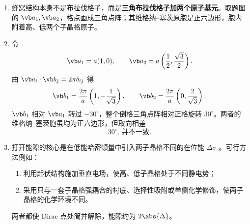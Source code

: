 \begin{question}[10 分]
\begin{solution}
\begin{enumerate}
  \item 蜂窝结构本身不是布拉伐格子，而是\textbf{三角布拉伐格子加两个原子基元}。取题图的 $\vb a_1,\vb a_2$，格点画成三角点阵；其维格纳--塞茨原胞是正六边形，胞内附着高、低两个子晶格原子。
  \begin{center}
  \end{center}
  \item 令
  \[
    \vb a_1=a(1,0),\qquad
    \vb a_2=a\left(\frac12,\frac{\sqrt3}{2}\right).
  \]
  由 $\vb a_i\cdot\vb b_j=2\pi\delta_{ij}$ 得
  \[
    \vb b_1=\frac{2\pi}{a}\left(1,-\frac1{\sqrt3}\right),
    \qquad
    \vb b_2=\frac{2\pi}{a}\left(0,\frac2{\sqrt3}\right).
  \]
  $\vb b_1$ 相对 $\vb a_1$ 转过 $-30^\circ$，整个倒格三角点阵相对正格旋转 $30^\circ$。两者的维格纳--塞茨胞虽均为正六边形，但取向相差
  \[
    \boxed{30^\circ,\ \text{并不一致}.}
  \]
  \item 打开能隙的核心是在低能哈密顿量中引入两子晶格不同的在位能 $\Delta\sigma_z$。可行方法例如：
  \begin{enumerate}
    \item 利用起伏结构施加垂直电场，使高、低子晶格处于不同静电势；
    \item 采用只与一套子晶格强耦合的衬底、选择性吸附或单侧化学修饰，使两子晶格的化学环境不同。
  \end{enumerate}
  两者都使 Dirac 点处简并解除，能隙约为 $2\abs{\Delta}$。
\end{enumerate}
\end{solution}
\end{question}


